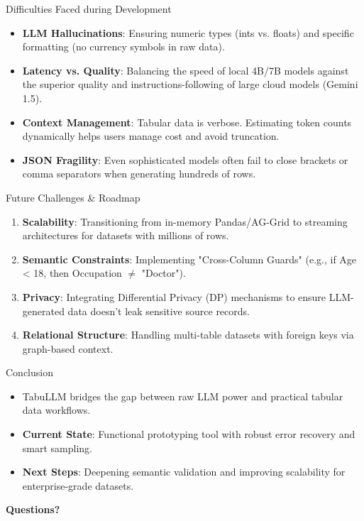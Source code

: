 \documentclass{beamer}
\begin{document}
\begin{frame}{Difficulties Faced during Development}
    \begin{itemize}
        \item \textbf{LLM Hallucinations}: Ensuring numeric types (ints vs. floats) and specific formatting (no currency symbols in raw data).
        \item \textbf{Latency vs. Quality}: Balancing the speed of local 4B/7B models against the superior quality and instructions-following of large cloud models (Gemini 1.5).
        \item \textbf{Context Management}: Tabular data is verbose. Estimating token counts dynamically helps users manage cost and avoid truncation.
        \item \textbf{JSON Fragility}: Even sophisticated models often fail to close brackets or comma separators when generating hundreds of rows.
    \end{itemize}
\end{frame}

\begin{frame}{Future Challenges \& Roadmap}
    \begin{enumerate}
        \item \textbf{Scalability}: Transitioning from in-memory Pandas/AG-Grid to streaming architectures for datasets with millions of rows.
        \item \textbf{Semantic Constraints}: Implementing "Cross-Column Guards" (e.g., if Age < 18, then Occupation $\neq$ "Doctor").
        \item \textbf{Privacy}: Integrating Differential Privacy (DP) mechanisms to ensure LLM-generated data doesn't leak sensitive source records.
        \item \textbf{Relational Structure}: Handling multi-table datasets with foreign keys via graph-based context.
    \end{enumerate}
\end{frame}

\begin{frame}{Conclusion}
    \begin{itemize}
        \item TabuLLM bridges the gap between raw LLM power and practical tabular data workflows.
        \item \textbf{Current State}: Functional prototyping tool with robust error recovery and smart sampling.
        \item \textbf{Next Steps}: Deepening semantic validation and improving scalability for enterprise-grade datasets.
    \end{itemize}
    \vspace{0.8cm}
    \centering
    \textbf{Questions?}
\end{frame}
\end{document}

